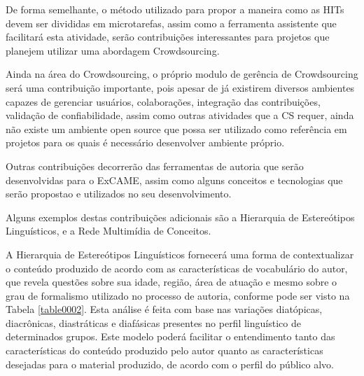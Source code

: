 \documentclass{sig-alternate}
\begin{document}
De forma semelhante, o método utilizado para propor a maneira como as HITs devem ser divididas em microtarefas, assim como a ferramenta assistente que facilitará esta atividade, serão contribuições interessantes para projetos que planejem utilizar uma abordagem Crowdsourcing.

Ainda na área do Crowdsourcing, o próprio modulo de gerência de Crowdsourcing será uma contribuição importante, pois apesar de já existirem diversos ambientes capazes de gerenciar usuários, colaborações, integração das contribuições, validação de confiabilidade, assim como outras atividades que a CS requer, ainda não existe um ambiente open source que possa ser utilizado como referência em projetos para os quais é necessário desenvolver ambiente próprio.

Outras contribuições decorrerão das ferramentas de autoria que serão desenvolvidas para o ExCAME, assim como alguns conceitos e tecnologias que serão propostao e utilizados no seu desenvolvimento.

Alguns exemplos destas contribuições adicionais são a Hierarquia de Estereótipos Linguísticos, e a Rede Multimídia de Conceitos.

A Hierarquia de Estereótipos Linguísticos fornecerá uma forma de contextualizar o conteúdo produzido de acordo com as características de vocabulário do autor, que revela questões sobre sua idade, região, área de atuação e mesmo sobre o grau de formalismo utilizado no processo de autoria, conforme pode ser visto na Tabela \ref{table0002}. Esta análise é feita com base nas variações diatópicas, diacrônicas, diastráticas e diafásicas presentes no perfil linguístico de determinados grupos. Este modelo poderá facilitar o entendimento tanto das características do conteúdo produzido pelo autor quanto as características desejadas para o material produzido, de acordo com o perfil do público alvo.
\end{document}
